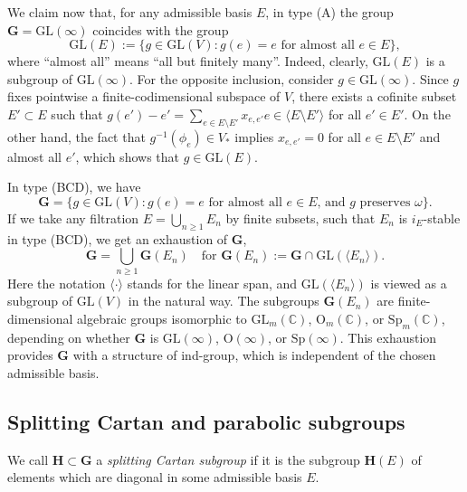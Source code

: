 \documentclass[12pt]{amsart}
\newcommand{\GL}{\mathrm{GL}}
\newcommand{\Sp}{\mathrm{Sp}}
\renewcommand{\O}{\mathrm{O}}
\newcommand{\G}{\mathbf{G}}
\renewcommand{\H}{\mathbf{H}}
\newcommand{\C}{\mathbb{C}}
\renewcommand{\span}[1]{\langle #1\rangle}
\numberwithin{equation}{section}
\theoremstyle{definition}
\begin{document}

We claim now that, for any admissible basis $E$, in type (A) the group $\G=\GL(\infty)$ coincides with the group 
\[
\GL(E):=\{g\in\GL(V):g(e)=e\mbox{ for almost all $e\in E$}\},
\]
where ``almost all'' means ``all but finitely many''.
Indeed, clearly, $\GL(E)$ is a subgroup of $\GL(\infty)$. For the opposite inclusion, consider $g\in\GL(\infty)$.
Since 
$g$ fixes pointwise a finite-codimensional subspace of $V$, there exists a cofinite subset $E'\subset E$ such that 
$g(e')-e'=\sum_{e\in E\setminus E'}x_{e,e'}e\in\span{E\setminus E'}$ 
for all $e'\in E'$. On the other hand,
the fact that $g^{-1}(\phi_e)\in V_*$ implies $x_{e,e'}=0$ for 
all $e\in E\setminus E'$ and almost all $e'$, which shows that $g\in \GL(E)$.

In type (BCD), we have
\[
\G=\{g\in\GL(V):g(e)=e\mbox{ for almost all $e\in E$, and $g$ preserves $\omega$}\}.
\]
If we take any filtration $E=\bigcup_{n\geq 1}E_n$ by finite subsets, such that $E_n$ is $i_E$-stable in type (BCD), 
we get an exhaustion of $\G$,
\[
\G=\bigcup_{n\geq 1}\G(E_n)\quad\mbox{for $\G(E_n):=\G\cap\GL(\langle E_n\rangle)$}.
\]
Here the notation $\langle\cdot\rangle$ stands for the linear span,
and $\GL(\langle E_n\rangle)$ is viewed as a subgroup of $\GL(V)$ in the natural way. 
The subgroups $\G(E_n)$ are finite-dimensional algebraic groups isomorphic to $\GL_m(\C)$, $\O_m(\C)$, or $\Sp_m(\C)$, depending on whether $\G$ is $\GL(\infty)$, $\O(\infty)$, or $\Sp(\infty)$. This exhaustion provides $\G$ with a structure of ind-group, which is independent of the chosen admissible basis. 

\subsection{Splitting Cartan and parabolic subgroups} 
\label{section-1.2}
We call $\H\subset \G$ a {\em splitting Cartan subgroup} if it is the subgroup $\H(E)$ of elements which are diagonal in some admissible basis $E$.
\end{document}

